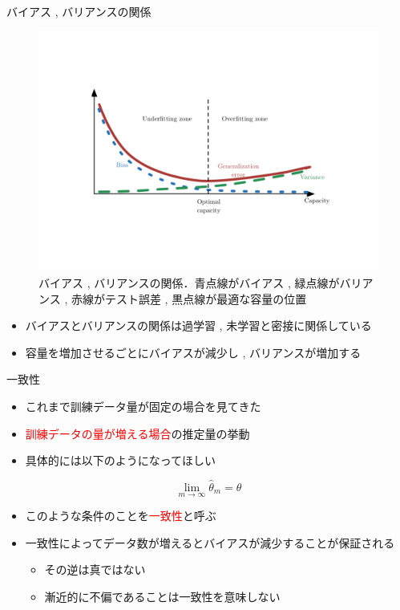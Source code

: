 \documentclass[dvipdfmx, 10pt]{beamer}
\begin{document}
\begin{frame}{バイアス , バリアンスの関係}
  \begin{figure}[htbp]
    \includegraphics[keepaspectratio, scale=0.4, angle=-90]{./images/bias-variance.pdf}
    \caption{バイアス , バリアンスの関係．青点線がバイアス , 緑点線がバリアンス , 赤線がテスト誤差 , 黒点線が最適な容量の位置}
  \end{figure}
  \begin{itemize}
    \item バイアスとバリアンスの関係は過学習 , 未学習と密接に関係している
    \item 容量を増加させるごとにバイアスが減少し , バリアンスが増加する
  \end{itemize}
\end{frame}


\begin{frame}{一致性}
  \begin{itemize}
    \item これまで訓練データ量が固定の場合を見てきた
    \item \textcolor{red}{訓練データの量が増える場合}の推定量の挙動
    \item 具体的には以下のようになってほしい
  \end{itemize}
  \begin{equation}
    \lim_{m \to \infty} \hat{\theta}_{m} = \theta
  \end{equation}
  \begin{itemize}
    \item このような条件のことを\textcolor{red}{一致性}と呼ぶ
    \item 一致性によってデータ数が増えるとバイアスが減少することが保証される
    \begin{itemize}
      \item その逆は真ではない
      \item 漸近的に不偏であることは一致性を意味しない
    \end{itemize}
  \end{itemize}
\end{frame}

\end{document}
